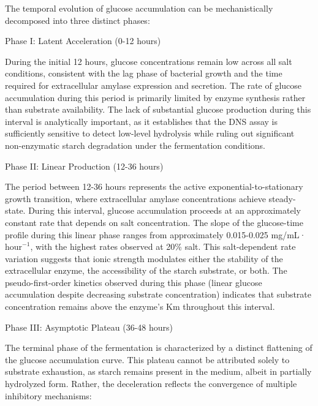 \documentclass[
  12pt,
]{article}
\begin{document}
The temporal evolution of glucose accumulation can be mechanistically
decomposed into three distinct phases:

Phase I: Latent Acceleration (0-12 hours)

During the initial 12 hours, glucose concentrations remain low across
all salt conditions, consistent with the lag phase of bacterial growth
and the time required for extracellular amylase expression and
secretion. The rate of glucose accumulation during this period is
primarily limited by enzyme synthesis rather than substrate
availability. The lack of substantial glucose production during this
interval is analytically important, as it establishes that the DNS assay
is sufficiently sensitive to detect low-level hydrolysis while ruling
out significant non-enzymatic starch degradation under the fermentation
conditions.

Phase II: Linear Production (12-36 hours)

The period between 12-36 hours represents the active
exponential-to-stationary growth transition, where extracellular amylase
concentrations achieve steady-state. During this interval, glucose
accumulation proceeds at an approximately constant rate that depends on
salt concentration. The slope of the glucose-time profile during this
linear phase ranges from approximately 0.015-0.025
mg/mL·\(\text{hour}^{-1}\), with the highest rates observed at 20\%
salt. This salt-dependent rate variation suggests that ionic strength
modulates either the stability of the extracellular enzyme, the
accessibility of the starch substrate, or both. The pseudo-first-order
kinetics observed during this phase (linear glucose accumulation despite
decreasing substrate concentration) indicates that substrate
concentration remains above the enzyme's Km throughout this interval.

Phase III: Asymptotic Plateau (36-48 hours)

The terminal phase of the fermentation is characterized by a distinct
flattening of the glucose accumulation curve. This plateau cannot be
attributed solely to substrate exhaustion, as starch remains present in
the medium, albeit in partially hydrolyzed form. Rather, the
deceleration reflects the convergence of multiple inhibitory mechanisms:
\end{document}
